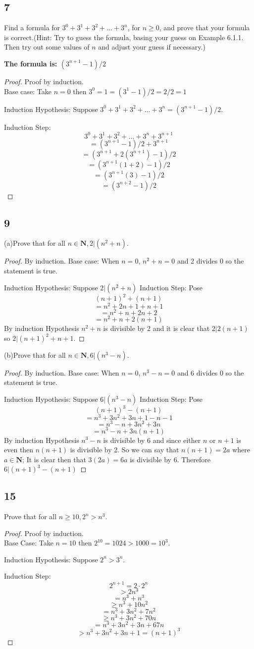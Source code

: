 \documentclass{article}
\begin{document}
\subsection{7}
Find a formula for $3^0+3^1+3^2+ \dots +3^n$, for $n \geq 0$, and prove that your formula is correct.(Hint: Try to guess the formula, basing your guess on Example 6.1.1. Then try out some values of $n$ and adjust your guess if necessary.)

\textbf{The formula is: $(3^{n+1}-1)/2$}
\begin{proof}Proof by induction. $ $\\
    Base case: Take $n=0$ then $3^0=1=(3^1-1)/2=2/2=1$

    Induction Hypothesis: Suppose $3^0+3^1+3^2+\dots+3^n=(3^{n+1}-1)/2$.

    Induction Step: 
    $$3^0+3^1+3^2+\dots+3^n+3^{n+1}$$
    $$=(3^{n+1}-1)/2 + 3^{n+1}$$
    $$=(3^{n+1}+2(3^{n+1})-1)/2$$
    $$=(3^{n+1}(1+2)-1)/2$$
    $$=(3^{n+1}(3)-1)/2$$
    $$=(3^{n+2}-1)/2$$
    
\end{proof}
\subsection{9}

(a)Prove that for all $n\in \mathbf{N},2|(n^2+n).$
\begin{proof} By induction.
    Base case: When $n=0$, $n^2+n=0$ and 2 divides 0 so the statement is true.

    Induction Hypothesis: Suppose $2|(n^2+n)$
    Induction Step: 
    Pose $$(n+1)^2+(n+1)$$
    $$=n^2+2n+1+n+1$$
    $$=n^2+n+2n+2$$
    $$=n^2+n+2(n+1)$$
    By induction Hypothesis $n^2+n$ is divisible by 2 and it is clear that $2|2(n+1)$ so $2|(n+1)^2+n+1$.
\end{proof}
(b)Prove that for all $n \in \mathbf{N},6|(n^3-n).$
\begin{proof} By induction.
    Base case: When $n=0$, $n^3-n=0$ and 6 divides 0 so the statement is true.

    Induction Hypothesis: Suppose $6|(n^3-n)$
    Induction Step: 
    Pose $$(n+1)^3-(n+1)$$
    $$=n^3+3n^2+3n+1-n-1$$
    $$=n^3-n+3n^2+3n$$
    $$=n^3-n+3n(n+1)$$
    By induction Hypothesis $n^3-n$ is divisible by 6 and since either $n$ or $n+1$ is even then $n(n+1)$ is divisible by 2. So we can say that $n(n+1)=2a$ where $a \in \mathbf{N}$; It is clear then that $3(2a)=6a$ is divisible by 6. Therefore $6|(n+1)^3-(n+1)$
\end{proof}
\subsection{15}
Prove that for all $n\geq 10, 2^n>n^3$.

\begin{proof}Proof by induction. $ $\\
Base Case: Take $n=10$ then $2^10=1024>1000=10^3$.

Induction Hypothesis: Suppose $2^n>3^n$.

Induction Step:
$$2^{n+1}=2 \cdot 2^n$$
$$>2n^3$$
$$=n^3+n^3$$
$$\geq n^3 + 10n^2$$
$$=n^3+3n^2+7n^2$$
$$\geq n^3 +3n^2+70n$$
$$=n^3+3n^2+3n+67n$$
$$>n^3+3n^2+3n+1=(n+1)^3$$
\end{proof}
\end{document}

